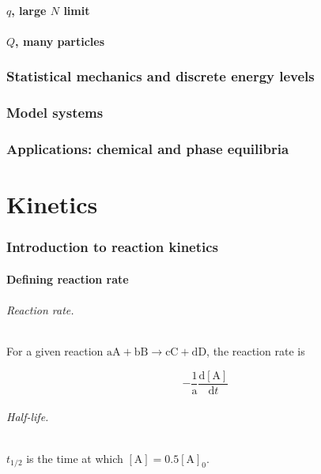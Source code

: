 \documentclass{article}
\numberwithin{theorem}{section}
\numberwithin{corollary}{section}
\numberwithin{postulate}{section}
\numberwithin{lemma}{section}
\numberwithin{definition}{section}
\begin{document}
\subsection{$q$, large $N$ limit}

\subsection{$Q$, many particles}

\section{Statistical mechanics and discrete energy levels}

\section{Model systems}

\section{Applications: chemical and phase equilibria}

\part{Kinetics}

\section{Introduction to reaction kinetics}

\subsection{Defining reaction rate}

\paragraph{Reaction rate.} For a given reaction $\mathrm{aA} + \mathrm{bB}
\rightarrow \mathrm{cC} + \mathrm{dD}$, the reaction rate is

\begin{equation}
  -\frac{1}{\mathrm{a}} \frac{\mathrm{d[A]}}{\mathrm{d}t} 
\end{equation}

\paragraph{Half-life.} $t_{1/2}$ is the time at which $[\mathrm{A}] =
0.5[\mathrm{A}]_0$.
\end{document}
